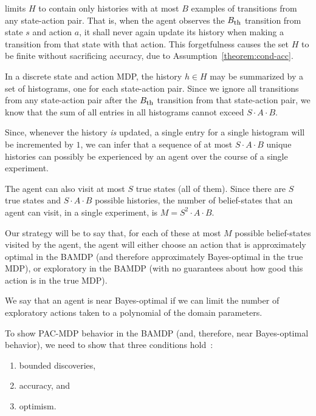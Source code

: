  limits $H$ to contain only histories with at most $B$ examples of transitions from any state-action pair. That is, when the agent observes the $B_{\mbox{\footnotesize{th}}}$ transition from state $s$ and action $a$, it shall never again update its history when making a transition from that state with that action. This forgetfulness causes the set $H$ to be finite without sacrificing accuracy, due to Assumption~\ref{theorem:cond-acc}.

In a discrete state and action MDP, the history $h\in H$ may be summarized by a set of histograms, one for each state-action pair. Since we ignore all transitions from any state-action pair after the $B_{\mbox{\footnotesize{th}}}$ transition from that state-action pair, we know that the sum of all entries in all histograms cannot exceed $S\cdot A \cdot B$.

Since, whenever the history \emph{is} updated, a single entry for a single histogram will be incremented by $1$, we can infer that a sequence of at most $S\cdot A \cdot B$ unique histories can possibly be experienced by an agent over the course of a single experiment.

The agent can also visit at most $S$ true states (all of them). Since there are $S$ true states and $S\cdot A \cdot B$ possible histories, the number of belief-states that an agent can visit, in a single experiment, is $M = S^2\cdot A \cdot B$.

Our strategy will be to say that, for each of these at most $M$ possible belief-states visited by the agent, the agent will either choose an action that is approximately optimal in the BAMDP (and therefore approximately Bayes-optimal in the true MDP), or exploratory in the BAMDP (with no guarantees about how good this action is in the true MDP).

We say that an agent is near Bayes-optimal if we can limit the number of exploratory actions taken to a polynomial of the domain parameters.

To show PAC-MDP behavior in the BAMDP (and, therefore, near Bayes-optimal behavior), we need to show that three conditions hold~\cite{lihong09pacmdp}:
\begin{enumerate}
\item \label{pacmdp-disc} bounded discoveries,
\item \label{pacmdp-acc} accuracy, and
\item \label{pacmdp-opt} optimism.
\end{enumerate}

